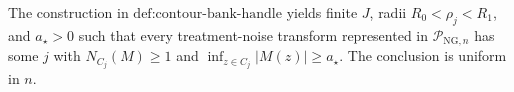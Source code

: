The construction in \(\text{def:contour-bank-handle}\) yields finite \(J\), radii \(R_0<\rho_j<R_1\), and \(a_{\star}>0\) such that every treatment-noise transform represented in \(\mathcal P_{\mathrm{NG},n}\) has some \(j\) with \(N_{C_j}(M)\ge1\) and \(\inf_{z\in C_j}|M(z)|\ge a_{\star}\). The conclusion is uniform in \(n\).